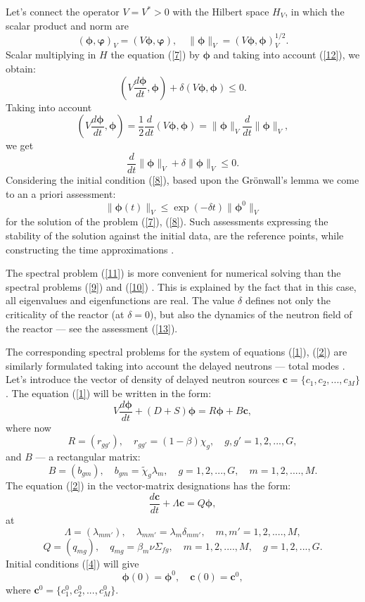 \documentclass[authoryear]{elsarticle}
\begin{document}
Let’s connect the operator $V = V^* > 0$ with the Hilbert space $H_V$, in which the scalar product and norm are
\[
 (\bm \phi , \bm \varphi)_V =  (V \bm \phi , \bm \varphi),
 \quad  \|\bm \phi\|_V =  (V \bm \phi , \bm \phi)_V^{1/2} . 
\] 
Scalar multiplying in $H$ the equation (\ref{7}) by $\bm \phi$ and taking into account (\ref{12}), we obtain:
\[
 \left ( V \frac{d \bm \phi}{d t} , \bm \phi \right ) + \delta (V \bm \phi, \bm \phi ) \leq 0.
\] 
Taking into account
\[
 \left ( V \frac{d \bm \phi}{d t} , \bm \phi \right ) =
 \frac{1}{2} \frac{d}{d t} (V \bm \phi, \bm \phi) = 
 \|\bm \phi\|_V \frac{d }{d t}\|\bm \phi\|_V ,
\] 
we get
\[
 \frac{d }{d t} \|\bm \phi\|_V + \delta \|\bm \phi\|_V \leq 0 .
\] 
Considering the initial condition (\ref{8}), based upon the Grönwall's lemma we come to an a priori assessment:
\begin{equation}\label{13}
 \|\bm \phi(t)\|_V \leq \exp (-\delta t ) \|\bm \phi^0\|_V 
\end{equation} 
for the solution of the problem (\ref{7}), (\ref{8}). Such assessments expressing the stability of the solution against the initial data, are the reference points, while constructing the time approximations
\cite{Samarskiibook,SamarskiiMatusVabischevich2002}. 

The spectral problem (\ref{11}) is more convenient for numerical solving than the spectral problems (\ref{9}) and (\ref{10})
\cite{Golubbook,Saadbook}. This is explained by the fact that in this case, all eigenvalues and eigenfunctions are real. The value $\delta$ defines not only the criticality of the reactor (at $\delta = 0$), but also the dynamics of the neutron field of the reactor –-- see the assessment (\ref{13}).

The corresponding spectral problems for the system of equations (\ref{1}), (\ref{2}) are similarly formulated taking into account the delayed neutrons --- total modes \cite{verdu20103d}.
Let’s introduce the vector of density of delayed neutron sources $\bm c = \{c_1, c_2, ..., c_M\}$. The equation (\ref{1}) will be written in the form:
\begin{equation}\label{14}
 V \frac{d \bm \phi}{d t} + (D+S) \bm \phi = R \bm \phi +
 B \bm c,
\end{equation} 
where now
\[
 R = (r_{g g'}),
 \quad  r_{g g'} = (1-\beta) \chi_g ,
 \quad g, g' = 1,2, ..., G,
\] 
and $B$ --- a rectangular matrix:
\[
 B = (b_{gm}),
 \quad  b_{gm} = \widetilde{\chi}_g \lambda_m,
 \quad g = 1,2, ..., G,
 \quad m = 1,2, ....,M .  
\] 
The equation (\ref{2}) in the vector-matrix designations has the form:
\begin{equation}\label{15}
 \frac{d \bm c}{d t} + \Lambda \bm c = Q \bm \phi ,
\end{equation} 
at
\[
 \Lambda = (\lambda_{m m'}),
 \quad  \lambda_{m m'} = \lambda_m \delta_{m m'} ,
 \quad m, m' = 1,2, ....,M ,  
\] 
\[
 Q = (q_{mg}),
 \quad  q_{mg} = \beta_m \nu \Sigma_{fg},
 \quad m = 1,2, ....,M ,  
 \quad g = 1,2, ..., G .
\] 
Initial conditions (\ref{4}) will give
\begin{equation}\label{16}
 \bm \phi(0) = \bm \phi^0,
 \quad  \bm c(0) = \bm c^0,
\end{equation} 
where $\bm c^0 = \{ c_1^0,  c_2^0, ...,  c_M^0 \}$.
\end{document}
